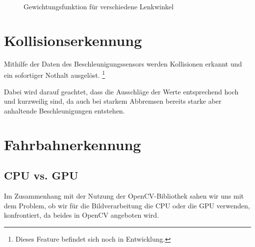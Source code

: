 \documentclass[a4paper,12pt]{report}
\begin{document}
	\begin{figure}[ht]
		\centering

		\caption{Gewichtungsfunktion für verschiedene Lenkwinkel}
		\label{img-uss-function}
	\end{figure}




\chapter{Kollisionserkennung}

	Mithilfe der Daten des Beschleunigungssensors werden Kollisionen erkannt und ein sofortiger Nothalt ausgelöst.
	\footnote{Dieses Feature befindet sich noch in Entwicklung.}

	Dabei wird darauf geachtet, dass die Ausschläge der Werte entsprechend hoch und kurzweilig sind, da auch bei starkem Abbremsen bereits starke aber anhaltende Beschleunigungen entstehen.


\chapter{Fahrbahnerkennung}



\section{CPU vs. GPU}
Im Zusammenhang mit der Nutzung der OpenCV-Bibliothek sahen wir uns mit dem Problem, ob wir für die Bildverarbeitung die CPU oder die GPU verwenden, konfrontiert, da beides in OpenCV angeboten wird.
\end{document}
